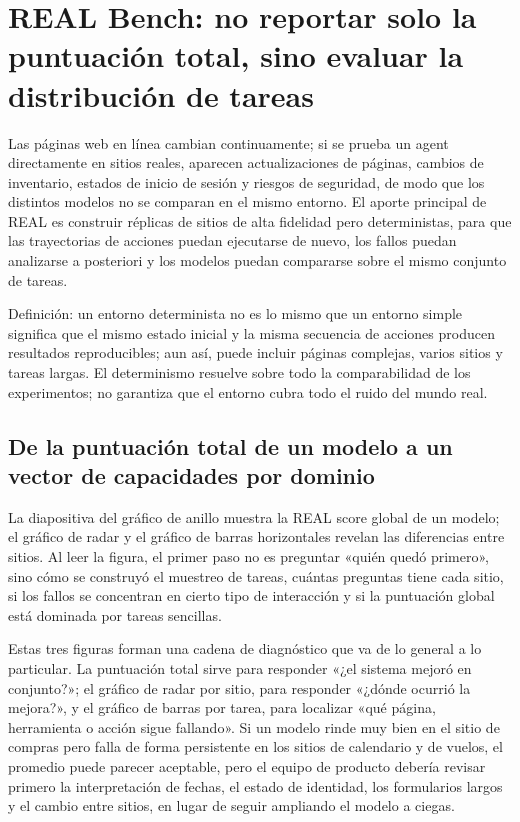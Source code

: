 \section{REAL Bench: no reportar solo la puntuación total, sino evaluar la distribución de tareas}

Las páginas web en línea cambian continuamente; si se prueba un agent directamente en sitios reales, aparecen actualizaciones de páginas, cambios de inventario, estados de inicio de sesión y riesgos de seguridad, de modo que los distintos modelos no se comparan en el mismo entorno. El aporte principal de REAL es construir réplicas de sitios de alta fidelidad pero deterministas, para que las trayectorias de acciones puedan ejecutarse de nuevo, los fallos puedan analizarse a posteriori y los modelos puedan compararse sobre el mismo conjunto de tareas.


\begin{importantbox}{Definición: un entorno determinista no es lo mismo que un entorno simple}
 significa que el mismo estado inicial y la misma secuencia de acciones producen resultados reproducibles; aun así, puede incluir páginas complejas, varios sitios y tareas largas. El determinismo resuelve sobre todo la comparabilidad de los experimentos; no garantiza que el entorno cubra todo el ruido del mundo real.
\end{importantbox}

\subsection{De la puntuación total de un modelo a un vector de capacidades por dominio}

La diapositiva del gráfico de anillo muestra la REAL score global de un modelo; el gráfico de radar y el gráfico de barras horizontales revelan las diferencias entre sitios. Al leer la figura, el primer paso no es preguntar «quién quedó primero», sino cómo se construyó el muestreo de tareas, cuántas preguntas tiene cada sitio, si los fallos se concentran en cierto tipo de interacción y si la puntuación global está dominada por tareas sencillas.

Estas tres figuras forman una cadena de diagnóstico que va de lo general a lo particular. La puntuación total sirve para responder «¿el sistema mejoró en conjunto?»; el gráfico de radar por sitio, para responder «¿dónde ocurrió la mejora?», y el gráfico de barras por tarea, para localizar «qué página, herramienta o acción sigue fallando». Si un modelo rinde muy bien en el sitio de compras pero falla de forma persistente en los sitios de calendario y de vuelos, el promedio puede parecer aceptable, pero el equipo de producto debería revisar primero la interpretación de fechas, el estado de identidad, los formularios largos y el cambio entre sitios, en lugar de seguir ampliando el modelo a ciegas.

